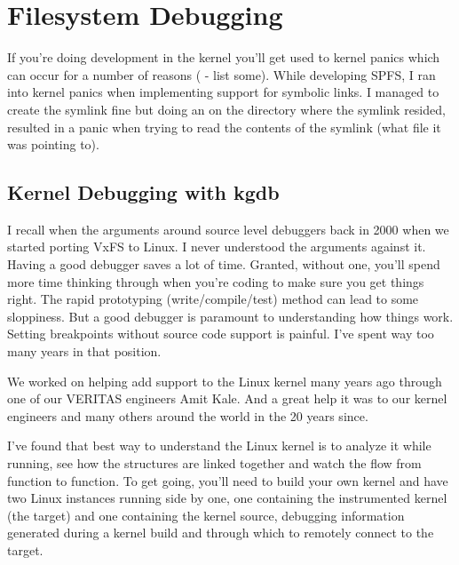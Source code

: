 \chapter{Filesystem Debugging}\label{debugging}

If you're doing development in the kernel you'll get used to kernel panics which can occur for a number of reasons ( - list some). While developing SPFS, I ran into kernel panics when implementing support for symbolic links. I managed to create the symlink fine but doing an  on the directory where the symlink resided, resulted in a panic when trying to read the contents of the symlink (what file it was pointing to).


\section{Kernel Debugging with kgdb}\label{kgdb}

I recall when the arguments around source level debuggers back in 2000 when we started porting VxFS to Linux. I never understood the arguments against it. Having a good debugger saves a lot of time. Granted, without one, you'll spend more time thinking through when you're coding to make sure you get things right. The rapid prototyping (write/compile/test) method can lead to some sloppiness. But a good debugger is paramount to understanding how things work. Setting breakpoints without source code support is painful. I've spent way too many years in that position.

We worked on helping add  support to the Linux kernel many years ago through one of our VERITAS engineers Amit Kale. And a great help it was to our kernel engineers and many others around the world in the 20 years since.

I've found that best way to understand the Linux kernel is to analyze it while running, see how the structures are linked together and watch the flow from function to function. To get going, you'll need to build your own kernel and have two Linux instances running side by one, one containing the instrumented kernel (the target) and one containing the kernel source, debugging information generated during a kernel build and  through which to remotely connect to the target.

